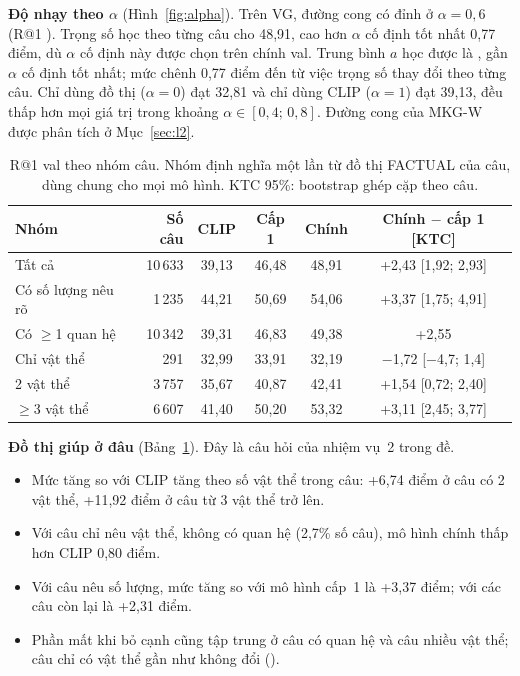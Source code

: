 \textbf{Độ nhạy theo $\alpha$} (Hình~\ref{fig:alpha}). Trên VG, đường cong có đỉnh ở $\alpha = 0{,}6$ (R@1
). Trọng số học theo từng câu cho 48,91, cao hơn $\alpha$ cố định tốt nhất 0,77 điểm, dù $\alpha$ cố định
này được chọn trên chính val. Trung bình $a$ học được là , gần $\alpha$ cố định tốt nhất; mức chênh 0,77
điểm đến từ việc trọng số thay đổi theo từng câu. Chỉ dùng đồ thị ($\alpha = 0$) đạt 32,81 và chỉ dùng CLIP ($\alpha = 1$) đạt
39,13, đều thấp hơn mọi giá trị trong khoảng $\alpha \in [0{,}4;\,0{,}8]$. Đường cong của MKG-W được phân tích ở
Mục~\ref{sec:l2}.

\begin{table}[t]
\centering
\caption{R@1 val theo nhóm câu. Nhóm định nghĩa một lần từ đồ thị FACTUAL của câu, dùng chung cho mọi mô hình. KTC 95\%:
bootstrap ghép cặp theo câu.}
\label{tab:l1-groups}
\footnotesize
\setlength{\tabcolsep}{2pt}
\begin{tabular}{lrcccc}
\toprule
Nhóm & Số câu & CLIP & Cấp 1 & Chính & Chính $-$ cấp 1 [KTC] \\
\midrule
Tất cả & 10\,633 & 39,13 & 46,48 & 48,91 & +2,43 [1,92; 2,93] \\
Có số lượng nêu rõ & 1\,235 & 44,21 & 50,69 & 54,06 & +3,37 [1,75; 4,91] \\
Có $\ge$1 quan hệ & 10\,342 & 39,31 & 46,83 & 49,38 & +2,55 \\
Chỉ vật thể & 291 & 32,99 & 33,91 & 32,19 & $-$1,72 [$-$4,7; 1,4] \\
2 vật thể & 3\,757 & 35,67 & 40,87 & 42,41 & +1,54 [0,72; 2,40] \\
$\ge$3 vật thể & 6\,607 & 41,40 & 50,20 & 53,32 & +3,11 [2,45; 3,77] \\
\bottomrule
\end{tabular}
\end{table}

\textbf{Đồ thị giúp ở đâu} (Bảng~\ref{tab:l1-groups}). Đây là câu hỏi của nhiệm vụ~2 trong đề.
\begin{itemize}
\item Mức tăng so với CLIP tăng theo số vật thể trong câu: +6,74 điểm ở câu có 2 vật thể, +11,92 điểm ở câu từ 3 vật thể
trở lên.
\item Với câu chỉ nêu vật thể, không có quan hệ (2,7\% số câu), mô hình chính thấp hơn CLIP 0,80 điểm.
\item Với câu nêu số lượng, mức tăng so với mô hình cấp~1 là +3,37 điểm; với các câu còn lại là +2,31 điểm.
\item Phần mất khi bỏ cạnh cũng tập trung ở câu có quan hệ và câu nhiều vật thể; câu chỉ có vật thể gần như không đổi
().
\end{itemize}

